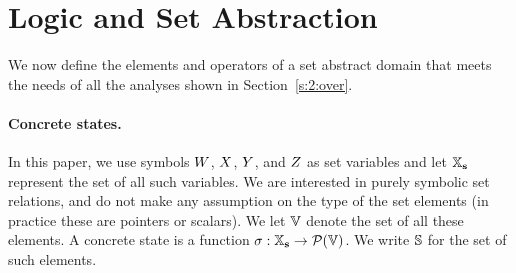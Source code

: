 \section{Logic and Set Abstraction}
\label{sec:logic-and-set-abstraction} \label{s:3:abs}
We now define the elements and operators of a set abstract domain that meets the needs of all the analyses shown in Section~\ref{s:2:over}.

\paragraph{Concrete states.}
In this paper, we use symbols $W$, $X$, $Y$, and $Z$ as set variables
and let $\mathbb{X}_{\bf s}$ represent the set of all such variables.
We are interested in purely symbolic set relations, and do not make any
assumption on the type of the set elements (in practice these are pointers
or scalars).
We let \( \mathbb{V} \) denote the set of all these elements.
A concrete state is a function \( \sigma: \mathbb{X}_{\bf s} \rightarrow
\mathcal{P}(\mathbb{V}) \).
We write \( \mathbb{S} \) for the set of such elements.

